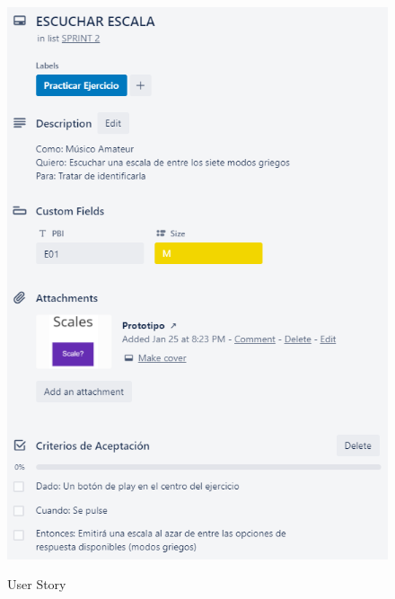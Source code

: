 \documentclass[12pt,twoside,titlepage]{report}
\begin{document}
\begin{figure}[H]
    \centering
    \includegraphics[scale=1.3]{Scrum/User Stories/Escalas}
    \label{fig:Escalas}
    \caption{User Story}
\end{figure}
\end{document}
